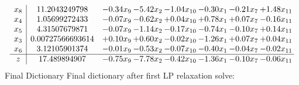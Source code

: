 \documentclass[8pt]{article}
\begin{document}
 \[\begin{array}{c| c c@{\hskip 2pt} c@{\hskip 2pt} c@{\hskip 2pt} c@{\hskip 2pt} c@{\hskip 2pt} c@{\hskip 2pt} }
 x_{8}   &  11.2043249798 & -0.34 x_{9} & -5.42 x_{2} & -1.04 x_{10} & -0.30 x_{1} & -0.21 x_{7} & +  1.48 x_{11}\\
 x_{4}   &  1.05699272433 & -0.07 x_{9} & -0.62 x_{2} & +  0.04 x_{10} & +  0.78 x_{1} & +  0.07 x_{7} & -0.16 x_{11}\\
 x_{5}   &  4.31507679871 & -0.07 x_{9} & -1.14 x_{2} & -0.17 x_{10} & -0.74 x_{1} & -0.10 x_{7} & +  0.14 x_{11}\\
 x_{3}   &  0.00727566693614 & +  0.10 x_{9} & +  0.60 x_{2} & -0.02 x_{10} & -1.26 x_{1} & +  0.07 x_{7} & +  0.04 x_{11}\\
 x_{6}   &  3.12105901374 & -0.01 x_{9} & -0.53 x_{2} & -0.07 x_{10} & -0.40 x_{1} & -0.04 x_{7} & -0.02 x_{11}\\
\hline
z    &  17.489894907 & -0.75 x_{9} & -7.78 x_{2} & -0.42 x_{10} & -1.36 x_{1} & -0.10 x_{7} & -0.06 x_{11}\\
\end{array}\]
Final Dictionary
Final dictionary after first LP relaxation solve: 
\end{document}

